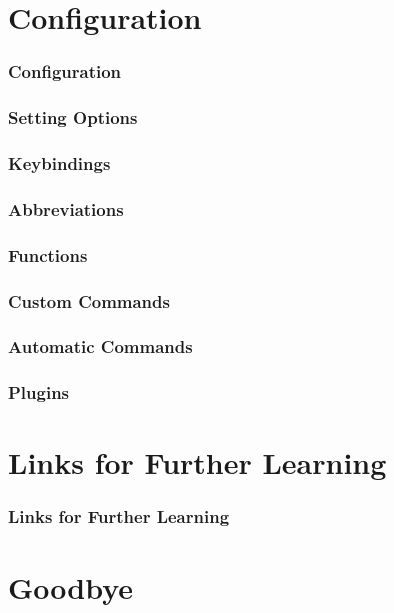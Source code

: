 \documentclass{beamer}
\begin{document}
\section{Configuration}

\begin{frame}[fragile]
    \frametitle{Configuration}
    \tableofcontents[currentsection]
\end{frame}

\begin{frame}[fragile]
    \frametitle{Setting Options}
\end{frame}

\begin{frame}[fragile]
    \frametitle{Keybindings}
\end{frame}

\begin{frame}[fragile]
    \frametitle{Abbreviations}
\end{frame}

\begin{frame}[fragile]
    \frametitle{Functions}
\end{frame}

\begin{frame}[fragile]
    \frametitle{Custom Commands}
\end{frame}

\begin{frame}[fragile]
    \frametitle{Automatic Commands}
\end{frame}

\begin{frame}[fragile]
    \frametitle{Plugins}
\end{frame}

\section{Links for Further Learning}

\begin{frame}[fragile]
    \frametitle{Links for Further Learning}
\end{frame}

\section{Goodbye}
\end{document}

